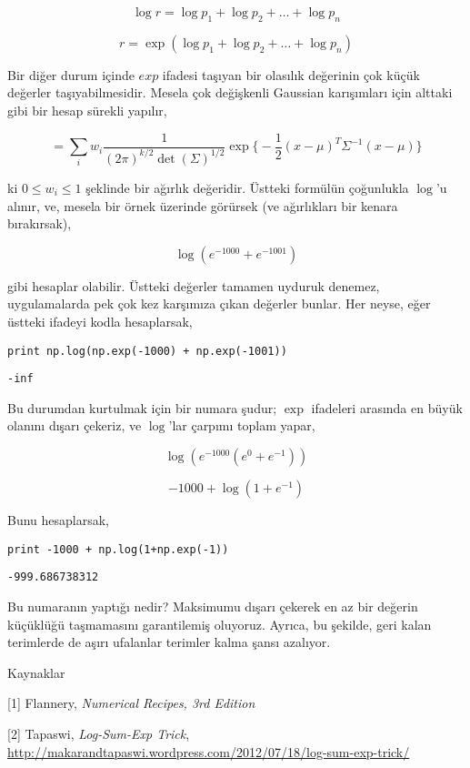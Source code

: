 \documentclass[12pt,fleqn]{article}\usepackage{../../common}
\begin{document}
$$ \log r = \log p_1 + \log p_2 + \dots + \log p_n $$

$$ r = \exp(\log p_1 + \log p_2 + \dots + \log p_n )$$

Bir diğer durum içinde $exp$ ifadesi taşıyan bir olasılık değerinin çok
küçük değerler taşıyabilmesidir. Mesela çok değişkenli Gaussian karışımları
için alttaki gibi bir hesap sürekli yapılır, 

$$ = \sum_i w_i
\frac{ 1}{(2\pi)^{k/2} \det(\Sigma)^{1/2}} \exp 
\bigg\{ 
-\frac{ 1}{2}(x-\mu)^T\Sigma^{-1}(x-\mu)
\bigg\}
 $$

ki $0 \le w_i \le 1$ şeklinde bir ağırlık değeridir. Üstteki formülün
çoğunlukla $\log$'u alınır, ve, mesela bir örnek üzerinde görürsek (ve
ağırlıkları bir kenara bırakırsak), 

$$ \log(e^{-1000} + e^{-1001}) $$ 

gibi hesaplar olabilir. Üstteki değerler tamamen uyduruk denemez,
uygulamalarda pek çok kez karşımıza çıkan değerler bunlar. Her neyse, eğer
üstteki ifadeyi kodla hesaplarsak, 

\begin{verbatim}
print np.log(np.exp(-1000) + np.exp(-1001))
\end{verbatim}

\begin{verbatim}
-inf
\end{verbatim}

Bu durumdan kurtulmak için bir numara şudur; $\exp$ ifadeleri arasında en
büyük olanını dışarı çekeriz, ve $\log$'lar çarpımı toplam yapar,

$$ \log(e^{-1000}(e^{0} + e^{-1} ))$$

$$ -1000 + \log(1 + e^{-1})$$

Bunu hesaplarsak, 

\begin{verbatim}
print -1000 + np.log(1+np.exp(-1))
\end{verbatim}

\begin{verbatim}
-999.686738312
\end{verbatim}

Bu numaranın yaptığı nedir? Maksimumu dışarı çekerek en az bir değerin
küçüklüğü taşmamasını garantilemiş oluyoruz. Ayrıca, bu şekilde, geri kalan
terimlerde de aşırı ufalanlar terimler kalma şansı azalıyor. 

Kaynaklar

[1] Flannery, {\em Numerical Recipes, 3rd Edition}

[2] Tapaswi, {\em Log-Sum-Exp Trick}, \url{http://makarandtapaswi.wordpress.com/2012/07/18/log-sum-exp-trick/}
\end{document}
